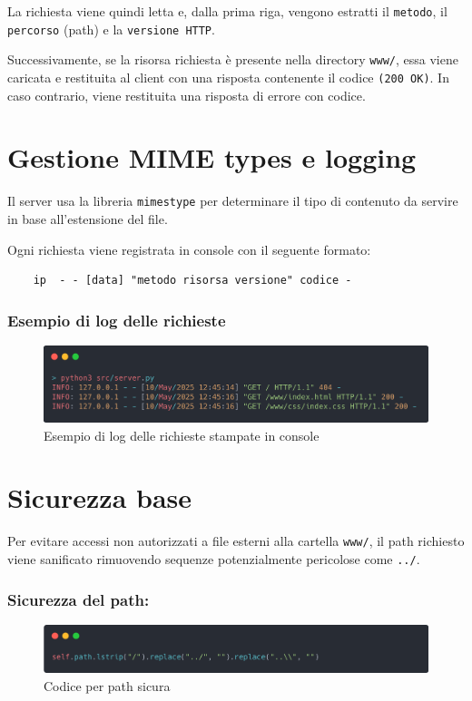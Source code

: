 \documentclass[a4paper,12pt]{report}
\begin{document}
La richiesta viene quindi letta e, dalla prima riga, vengono estratti il \texttt{metodo}, il \texttt{percorso} (path) e la \texttt{versione HTTP}.

Successivamente, se la risorsa richiesta è presente nella directory \texttt{www/}, essa viene caricata e restituita al client
con una risposta contenente il codice \texttt{(200 OK)}. In caso contrario, viene restituita una risposta di errore con
codice.


\section{Gestione MIME types e logging}
Il server usa la libreria \texttt{mimestype} per determinare il tipo di contenuto da servire in base all'estensione del
file.

Ogni richiesta viene registrata in console  con il seguente formato:

\begin{verbatim}
    ip  - - [data] "metodo risorsa versione" codice -
\end{verbatim}

\subsubsection{Esempio di log delle richieste}
\begin{figure}[H]
    \centering
    \includegraphics[width=1\textwidth]{img/logging.png}
    \caption{Esempio di log delle richieste stampate in console}
    \label{fig:logging}
\end{figure}

\section{Sicurezza base}

Per evitare accessi non autorizzati a file esterni alla cartella \texttt{www/}, il \newline path richiesto viene sanificato
rimuovendo sequenze potenzialmente pericolose come \texttt{../}.

\subsubsection{Sicurezza del path:}
\begin{figure}[H]
    \centering
    \includegraphics[width=1\textwidth]{img/safe_path.png}
    \caption{Codice per path sicura}
    \label{fig:safe_path}
\end{figure}
\end{document}
